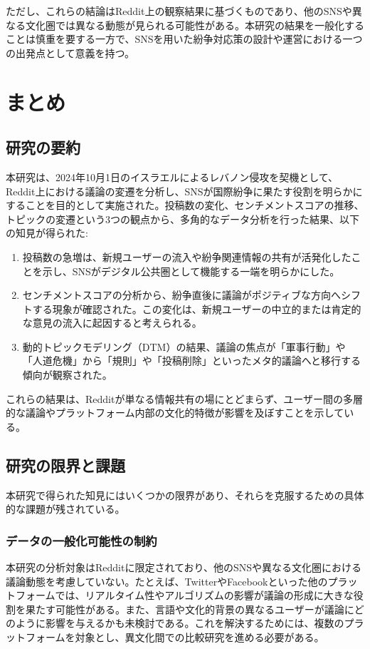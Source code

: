\documentclass[11pt, a4j]{jreport}
\begin{document}
    ただし、これらの結論はReddit上の観察結果に基づくものであり、他のSNSや異なる文化圏では異なる動態が見られる可能性がある。本研究の結果を一般化することは慎重を要する一方で、SNSを用いた紛争対応策の設計や運営における一つの出発点として意義を持つ。

    \chapter{まとめ}

    \section{研究の要約}
    本研究は、2024年10月1日のイスラエルによるレバノン侵攻を契機として、Reddit上における議論の変遷を分析し、SNSが国際紛争に果たす役割を明らかにすることを目的として実施された。投稿数の変化、センチメントスコアの推移、トピックの変遷という3つの観点から、多角的なデータ分析を行った結果、以下の知見が得られた:

    \begin{enumerate}
        \item 投稿数の急増は、新規ユーザーの流入や紛争関連情報の共有が活発化したことを示し、SNSがデジタル公共圏として機能する一端を明らかにした。
        \item センチメントスコアの分析から、紛争直後に議論がポジティブな方向へシフトする現象が確認された。この変化は、新規ユーザーの中立的または肯定的な意見の流入に起因すると考えられる。
        \item 動的トピックモデリング（DTM）の結果、議論の焦点が「軍事行動」や「人道危機」から「規則」や「投稿削除」といったメタ的議論へと移行する傾向が観察された。
    \end{enumerate}

    これらの結果は、Redditが単なる情報共有の場にとどまらず、ユーザー間の多層的な議論やプラットフォーム内部の文化的特徴が影響を及ぼすことを示している。

    \section{研究の限界と課題}
    本研究で得られた知見にはいくつかの限界があり、それらを克服するための具体的な課題が残されている。

    \subsection{データの一般化可能性の制約}
    本研究の分析対象はRedditに限定されており、他のSNSや異なる文化圏における議論動態を考慮していない。たとえば、TwitterやFacebookといった他のプラットフォームでは、リアルタイム性やアルゴリズムの影響が議論の形成に大きな役割を果たす可能性がある。また、言語や文化的背景の異なるユーザーが議論にどのように影響を与えるかも未検討である。これを解決するためには、複数のプラットフォームを対象とし、異文化間での比較研究を進める必要がある。
\end{document}
